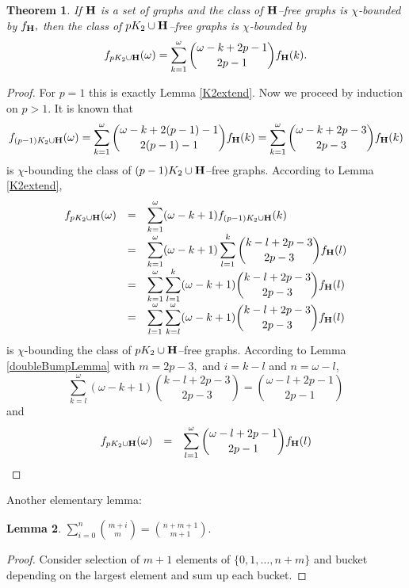 \documentclass{article}
\theoremstyle{plain}
\newtheorem{thm}{Theorem}
\newtheorem{lem}[thm]{Lemma}
\theoremstyle{definition}
\begin{document}
\begin{thm}\label{pK2extend}
If ${\bf H}$ is a set of graphs and the class of ${\bf H}$--free graphs is  $\chi$-bounded by $f_{\bf H},$ then the class of $pK_2 \cup {\bf H  } $--free graphs is $\chi$-bounded by
\[
f_{pK_2 \cup {\bf H  } }(\omega) = \sum_{k=1}^{\omega}   {\omega-k + 2p-1  \choose 2p-1}    f_{{\bf H  } }(k).
\]
\end{thm}

\begin{proof}
For $p=1$ this is exactly Lemma \ref{K2extend}. Now we proceed by induction on $p>1.$ It is known that 
\[
f_{(p-1)K_2 \cup {\bf H  } }(\omega) = \sum_{k=1}^{\omega}   {\omega-k + 2(p-1)-1  \choose 2(p-1)-1}    f_{{\bf H  } }(k) =  \sum_{k=1}^{\omega}   {\omega-k + 2p-3  \choose 2p-3}    f_{{\bf H  } }(k) 
\]
is $\chi$-bounding the class of $(p-1)K_2 \cup {\bf H  }$--free graphs.
According to Lemma \ref{K2extend},
\[
\begin{array}{rcl}
f_{pK_2 \cup {\bf H  } }(\omega) &= & \displaystyle \sum_{k=1}^{\omega}  (\omega-k+1)  f_{ (p-1)K_2 \cup  {\bf H  } }(k) \\
&= & \displaystyle \sum_{k=1}^{\omega}  (\omega-k+1)   \sum_{l=1}^{k}   {k-l + 2p-3  \choose 2p-3}    f_{{\bf H  } }(l) \\
&= & \displaystyle \sum_{k=1}^{\omega} \sum_{l=1}^{k}   (\omega-k+1)    {k-l + 2p-3  \choose 2p-3}    f_{{\bf H  } }(l) \\
&= & \displaystyle \sum_{l=1}^{\omega} \sum_{k=l}^{\omega}   (\omega-k+1)    {k-l + 2p-3  \choose 2p-3}    f_{{\bf H  } }(l) \\
\end{array}
\]
is $\chi$-bounding the class of $pK_2 \cup {\bf H  }$--free graphs. According to Lemma \ref{doubleBumpLemma} with  $m=2p-3, $ and $i=k-l$ and $n=\omega-l,$
\[ 
\sum_{k=l}^{\omega}   (\omega-k+1)    {k-l + 2p-3  \choose 2p-3} =  {\omega-l + 2p-1  \choose 2p-1}
\]
and
\[
\begin{array}{rcl}
f_{pK_2 \cup {\bf H  } }(\omega) &= &  \displaystyle \sum_{l=1}^{\omega}  {\omega-l + 2p-1  \choose 2p-1}    f_{{\bf H  } }(l) \\
\end{array}
\]
\end{proof}


Another elementary lemma:

\begin{lem}\label{singleBumpLemma}
$ \sum_{i=0}^n {m+i \choose m} = { n+m+1 \choose m+1 }. $
\end{lem}
\begin{proof}
Consider selection of $m+1$ elements of $\{0,1,\ldots, n+m\}$ and bucket depending on the largest element and sum up each bucket. 
\end{proof}
\end{document}
